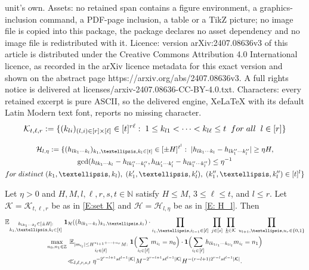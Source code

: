 \documentclass[10pt,a4paper]{amsart}
\newcommand{\Bigbrac}[1]{\Bigl( #1 \Bigr)}
\newcommand{\CH}{{\mathcal H}}
\newcommand{\CK}{{\mathcal K}}
\newcommand{\E}{{\mathbb E}}
\newcommand{\N}{{\mathbb N}}
\newcommand{\Z}{{\mathbb Z}}
\newcommand{\inv}{^{-1}}
\newcommand{\uk}{{\underline{k}}}
\begin{document}
unit's own. Assets: no retained span contains a figure environment, a graphics-inclusion command, a PDF-page inclusion, a table or a TikZ picture; no image file is copied into this package, the package declares no asset dependency and no image file is redistributed with it. Licence: version arXiv:2407.08636v3 of this article is distributed under the Creative Commons Attribution 4.0 International licence, as recorded in the arXiv licence metadata for this exact version and shown on the abstract page https://arxiv.org/abs/2407.08636v3. A full rights notice is delivered at licenses/arxiv-2407.08636-CC-BY-4.0.txt. Characters: every retained excerpt is pure ASCII, so the delivered engine, XeLaTeX with its default Latin Modern text font, reports no missing character.
\begin{align}\label{E:set K}
        \CK_{t, \ell, r} := \{(k_{li})_{\substack{(l,i)\in[r]\times[\ell]}}\in[t]^{r\ell}:\; 1\leq k_{l1}<\cdots < k_{l\ell}\leq t\;\; \textrm{for\; all}\;\; l\in[r]\}
    \end{align}

    \begin{multline}\label{E: H_l}
        \CH_{l,\eta} := \{(h_{lk_1\cdots k_l})_{k_1, \ldots, k_l\in[t]}\in[\pm H]^{t^l}:\; |h_{lk_1\cdots k_l}-h_{lk''_1\cdots k''_l}|\geq \eta H,\\ \gcd(h_{lk_1\cdots k_l}-h_{lk''_1\cdots k''_l}, h_{lk'_1\cdots k'_l}-h_{lk''_1\cdots k''_l})\leq \eta\inv\\
    \textrm{for\; distinct}\; (k_1, \ldots, k_l),\; (k'_1, \ldots, k'_l),\; (k''_1, \ldots, k''_l)\in[t]^l\}
    \end{multline}

\begin{lemma}\label{L: bound on pinned solutions}
Let $\eta>0$ and $H, M, l, \ell, r, s, t\in\N$ satisfy $H\leq M$,  $3\leq \ell\leq t$, and $l\leq r$. Let $\CK = \CK_{t, \ell, r}$ be as in \eqref{E:set K} and $\CH = \CH_{l, \eta}$ be as in \eqref{E: H_l}.
Then
    \begin{multline*}
        \E_{\substack{h_{lk_1\cdots k_l}\in[\pm H]:\\ k_1, \ldots, k_l\in[t]}}\; \mathbf{1}_{\CH}((h_{lk_1\cdots k_l})_{k_1, \ldots, k_l})\cdot \prod_{i_1, \ldots, i_{l-1}\in[\ell]}\;\prod_{j\in[s]}\;\prod_{\uk\in\CK}\; \prod_{u_{l+1}, \ldots, u_r\in\{0,1\}}\\ \max_{\substack{n_{0}, n_{1}\in\Z}}\;
        \E_{\substack{|m_{i_l}|\leq H^{u_{l+1}+\cdots + u_r} M:\\ i_l\in[\ell]}}\; \mathbf{1}\Bigbrac{\sum\limits_{i_l\in[\ell]}m_{i_l} = n_0}\cdot
        \mathbf{1}\Bigbrac{\sum\limits_{i_l\in[\ell]}h_{lk_{1i_1}\cdots k_{li_l}}m_{i_l} = n_1}\\
        \ll_{l, \ell, r, s, t}\eta^{-2^{r-l+1}s\ell^{l-1}|\CK|}  M^{-2^{r-l+1}s\ell^{l-1}|\CK|} H^{-(r-l+1)2^{r-l}s\ell^{l-1}|\CK|}.
    \end{multline*}
\end{lemma}
\end{document}
